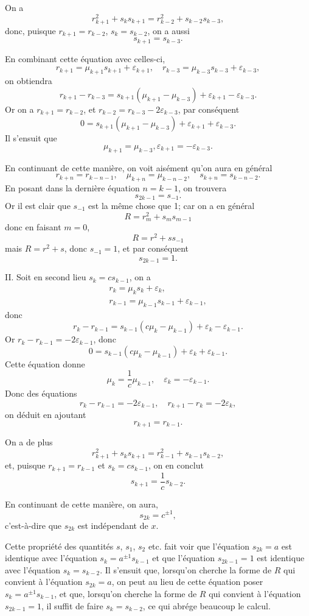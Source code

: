 \documentclass[oneside, 12 pt, leqno]{memoir}
\begin{document}
On a
\[r_{k+1}^2+s_k s_{k+1}=r_{k-2}^2+s_{k-2} s_{k-3},\]
donc, puisque \(r_{k+1}=r_{k-2}\), \(s_k=s_{k-2}\), on a aussi
\[s_{k+1}=s_{k-3}.\]

En combinant cette équation avec celles-ci,
\[r_{k+1}=\mu_{k+1} s_{k+1}+\varepsilon_{k+1}, \quad r_{k-3}=\mu_{k-3} s_{k-3}+\varepsilon_{k-3},\]
on obtiendra
\[r_{k+1}-r_{k-3}=s_{k+1}\left(\mu_{k+1}-\mu_{k-3}\right)+\varepsilon_{k+1}-\varepsilon_{k-3}.\]
Or on a \(r_{k+1}=r_{k-2}\), et \(r_{k-2}=r_{k-3}-2 \varepsilon_{k-3}\), par conséquent
\[0=s_{k+1}\left(\mu_{k+1}-\mu_{k-3}\right)+\varepsilon_{k+1}+\varepsilon_{k-3}.\]
Il s'ensuit que
\[\mu_{k+1}=\mu_{k-3}, \varepsilon_{k+1}=-\varepsilon_{k-3}.\]

En continuant de cette manière, on voit aisément qu’on aura en général
\[r_{k+n}=r_{k-n-1}, \quad \mu_{k+n}={\mu}_{k-n-2}, \quad s_{k+n}=s_{k-n-2}.\]
En posant dans la dernière équation \(n=k-1\), on trouvera
\[s_{2 k-1}=s_{-1}.\]
Or il est clair que \(s_{-1}\) est la même chose que 1; car on a en général
\[R=r_m^2+s_m s_{m-1}\]
donc en faisant \(m=0\),
\[R=r^2+s s_{-1}\]
mais \(R=r^2+s\), donc \(s_{-1}=1\), et par conséquent
\[s_{2 k-1}=1.\]

II. Soit en second lieu \(s_k=c s_{k-1}\), on a
\[\begin{gathered}
r_k=\mu_k s_k+\varepsilon_k, \\
r_{k-1}=\mu_{k-1} s_{k-1}+\varepsilon_{k-1},
\end{gathered}\]
donc
\[r_k-r_{k-1}=s_{k-1}\left(c \mu_k-\mu_{k-1}\right)+\varepsilon_k-\varepsilon_{k-1}.\]
Or \(r_k-r_{k-1}=-2 \varepsilon_{k-1}\), donc
\[0=s_{k-1}\left(c \mu_k-\mu_{k-1}\right)+\varepsilon_k+\varepsilon_{k-1}.\]
Cette équation donne
\[\mu_k=\frac{1}{c} \mu_{k-1}, \quad \varepsilon_k=-\varepsilon_{k-1}.\]
Donc des équations
\[r_k-r_{k-1}=-2 \varepsilon_{k-1}, \quad r_{k+1}-r_k=-2 \varepsilon_k,\]
on déduit en ajoutant
\[r_{k+1}=r_{k-1}.\]

On a de plus
\[r_{k+1}^2+s_k s_{k+1}=r_{k-1}^2+s_{k-1} s_{k-2},\]
et, puisque \(r_{k+1}=r_{k-1}\) et \(s_k=c s_{k-1}\), on en conclut
\[s_{k+1}=\frac{1}{c} s_{k-2}.\]

En continuant de cette manière, on aura,
\[s_{2 k}=c^{ \pm 1},\]
c'est-à-dire que \(s_{2 k}\) est indépendant de \(x\).

Cette propriété des quantités \(s\), \(s_1\), \(s_2\) etc. fait voir que l'équation \(s_{2 k}=a\) est identique avec l'équation \(s_k=a^{ \pm 1} s_{k-1}\) et que l'équation \(s_{2 k-1}=1\) est identique avec l'équation \(s_k=s_{k-2}\). Il s'ensuit que, lorsqu'on cherche la forme de \(R\) qui convient à l'équation \(s_{2 k}=a\), on peut au lieu de cette équation poser \(s_k=a^{ \pm 1} s_{k-1}\), et que, lorsqu'on cherche la forme de \(R\) qui convient à l'équation \(s_{2 k-1}=1\), il suffit de faire \(s_k=s_{k-2}\), ce qui abrége beaucoup le calcul.
\end{document}
